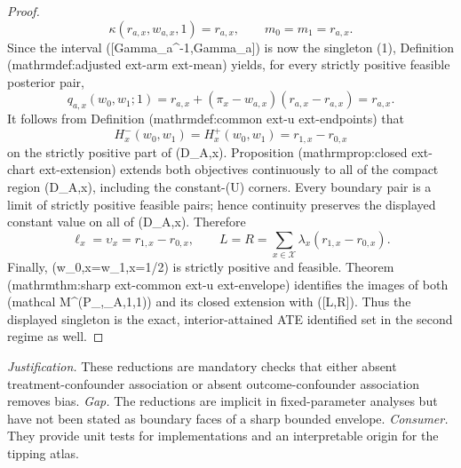 \documentclass{article}
\begin{document}
\begin{proof}
\[
\kappa(r_{a,x},w_{a,x},1)=r_{a,x},
\qquad m_0=m_1=r_{a,x}.
\]
Since the interval ([Gamma\_a\textasciicircum{}{-1},Gamma\_a]) is now the singleton ({1}), Definition (mathrm{def{:}adjusted  ext{-}arm  ext{-}mean}) yields, for every strictly positive feasible posterior pair,
\[
q_{a,x}(w_0,w_1;1)
=r_{a,x}+(\pi_x-w_{a,x})(r_{a,x}-r_{a,x})
=r_{a,x}.
\]
It follows from Definition (mathrm{def{:}common  ext{-}u  ext{-}endpoints}) that
\[
H^-_x(w_0,w_1)=H^+_x(w_0,w_1)=r_{1,x}-r_{0,x}
\]
on the strictly positive part of (D\_{A,x}).  Proposition (mathrm{prop{:}closed  ext{-}chart  ext{-}extension}) extends both objectives continuously to all of the compact region (D\_{A,x}), including the constant-(U) corners.  Every boundary pair is a limit of strictly positive feasible pairs; hence continuity preserves the displayed constant value on all of (D\_{A,x}).  Therefore
\[
\ell_x=\upsilon_x=r_{1,x}-r_{0,x},
\qquad
L=R=\sum_{x\in\mathcal X}\lambda_x(r_{1,x}-r_{0,x}).
\]
Finally, (w\_{0,x}=w\_{1,x}=1/2) is strictly positive and feasible.  Theorem (mathrm{thm{:}sharp  ext{-}common  ext{-}u  ext{-}envelope}) identifies the images of both (mathcal M\textasciicircum{}{\circ}(P\_{},\Gamma\_A,1,1)) and its closed extension with ([L,R]).  Thus the displayed singleton is the exact, interior-attained ATE identified set in the second regime as well.
\end{proof}
\par\smallskip\noindent \textit{Justification.} These reductions are mandatory checks that either absent treatment-confounder association or absent outcome-confounder association removes bias. \textit{Gap.} The reductions are implicit in fixed-parameter analyses but have not been stated as boundary faces of a sharp bounded envelope. \textit{Consumer.} They provide unit tests for implementations and an interpretable origin for the tipping atlas.
\end{document}
